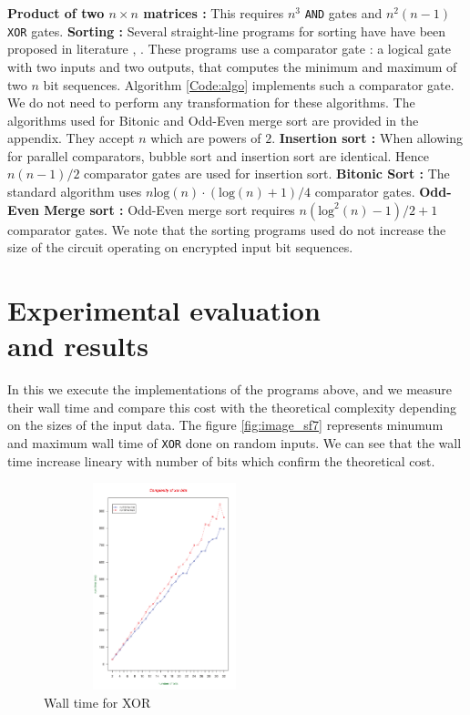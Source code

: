 \documentclass{acm_proc_article-sp}
\begin{document}
\textbf{Product of two $n\times n$ matrices :} This requires $n^3$ \texttt{AND} gates and \texttt{$n^2(n-1)$} \texttt{XOR} gates. \newline \newline
\textbf{Sorting :} Several straight-line programs for sorting have have been proposed in literature \cite{dk}, \cite{Batcher:1968:SNA:1468075.1468121}. These programs use a comparator gate : a logical gate with two inputs and two outputs, that computes the minimum and maximum of two $n$ bit sequences. Algorithm \autoref{Code:algo} implements such a comparator gate. We do not need to perform any transformation for these algorithms. The algorithms used for Bitonic and Odd-Even merge sort are provided in the appendix. They accept $n$ which are powers of $2$.
\newline \newline
\textbf{Insertion sort :} When allowing for parallel comparators, bubble sort and insertion sort are identical. Hence $n(n-1)/2$ comparator gates are used for insertion sort.\newline \newline
\textbf{Bitonic Sort :} The standard algorithm uses $n\mathrm{log}(n)·(\mathrm{log}(n)+1)/4$ comparator gates. \newline \newline
\textbf{Odd-Even Merge sort :} Odd-Even merge sort requires  $n(\mathrm{log}^{2}(n)-1)/2 + 1 $ comparator gates.\newline
We note that the sorting programs used do not increase the size of the circuit operating on encrypted input bit sequences.

\section{Experimental evaluation \\ and results}
\label{Sec:Eval}
In this we execute the implementations of the programs above, and we measure their wall time and compare this cost with the theoretical complexity depending on the sizes of the input data.
The figure \autoref{fig:image_sf7} represents minumum and maximum wall time of \texttt{XOR} done on random inputs. We can see that the wall time increase lineary with number of bits which confirm the theoretical cost.
\begin{figure}[!H]%
\centering
\includegraphics[width=7cm, height=6cm]{f4.pdf} 
\caption{Wall time for XOR} 
\label{fig:image_sf0} %
\end{figure}
\end{document}
